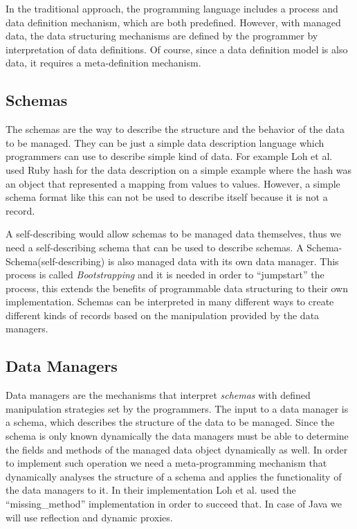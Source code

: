 In the traditional approach, the programming language includes a process and data definition mechanism, which are both predefined. 
However, with managed data, the data structuring mechanisms are defined by the programmer by interpretation of data definitions. 
Of course, since a data definition model is also data, it requires a meta-definition mechanism.

\subsection{Schemas}\label{Schemas}
The schemas are the way to describe the structure and the behavior of the data to be managed. 
They can be just a simple data description language which programmers can use to describe simple kind of data. 
For example Loh et al. \cite{loh2012managed} used Ruby hash for the data description on a simple example where the hash was an object that represented a mapping from values to values. 
However, a simple schema format like this can not be used to describe itself because it is not a record. 

A self-describing would allow schemas to be managed data themselves, thus we need a self-describing schema that can be used to describe schemas. 
A Schema-Schema(self-describing) is also managed data with its own data manager. 
This process is called \textit{Bootstrapping} and it is needed in order to ``jumpstart'' the process, this extends the benefits of programmable data structuring to their own implementation.
Schemas can be interpreted in many different ways to create different kinds of records based on the manipulation provided by the data managers.

\subsection{Data Managers}\label{Data Managers}
Data managers are the mechanisms that interpret \textit{schemas} with defined manipulation strategies set by the programmers. 
The input to a data manager is a schema, which describes the structure of the data to be managed.
Since the schema is only known dynamically the data managers must be able to determine the fields and methods of the managed data object dynamically as well.
In order to implement such operation we need a meta-programming mechanism that dynamically analyses the structure of a schema and applies the functionality of the data managers to it.
In their implementation Loh et al. \cite{loh2012managed} used the ``missing\_method'' implementation in order to succeed that.
In case of Java we will use reflection and dynamic proxies.

